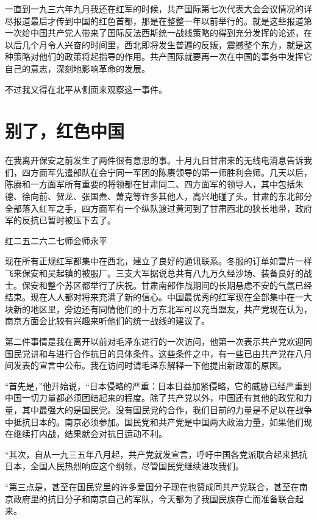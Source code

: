\documentclass[10pt]{book}
\begin{document}
一直到一九三六年九月我还在红军的时候，共产国际第七次代表大会会议情况的详尽报道最后才传到中国的红色首都，那是在整整一年以前举行的。就是这些报道第一次给中国共产党人带来了国际反法西斯统一战线策略的得到充分发挥的论述，在以后几个月令人兴奋的时间里，西北即将发生普遍的反叛，震撼整个东方，就是这种策略对他们的政策将起指导的作用。共产国际就要再一次在中国的事务中发挥它自己的意志，深刻地影响革命的发展。

不过我又得在北平从侧面来观察这一事件。

\section{别了，红色中国}

在我离开保安之前发生了两件很有意思的事。十月九日甘肃来的无线电消息告诉我们，四方面军先遣部队在会宁同一军团的陈赓领导的第一师胜利会师。几天以后，陈赓和一方面军所有重要的将领都在甘肃同二、四方面军的领导人，其中包括朱德、徐向前、贺龙、张国焘、萧克等许多其他人，高兴地碰了头。甘肃的东北部分全部落入红军之手，四方面军有一个纵队渡过黄河到了甘肃西北的狭长地带，政府军的反抗已暂时被压下去了。

红二五二六二七师会师永平

现在所有正规红军都集中在西北，建立了良好的通讯联系。冬服的订单如雪片一样飞来保安和吴起镇的被服厂。三支大军据说总共有八九万久经沙场、装备良好的战士。保安和整个苏区都举行了庆祝。甘肃南部作战期间的长期悬虑不安的气氛已经结束。现在人人都对将来充满了新的信心。中国最优秀的红军现在全部集中在一大块新的地区里，旁边还有同情他们的十万东北军可以充当盟友，共产党现在认为，南京方面会比较有兴趣来听他们的统一战线的建议了。

第二件事情是我在离开以前对毛泽东进行的一次访问，他第一次表示共产党欢迎同国民党讲和与进行合作抗日的具体条件。这些条件之中，有一些已由共产党在八月间发表的宣言中公布。我在访问时请毛泽东解释一下他提出新政策的原因。

“首先是，”他开始说，“日本侵略的严重：日本日益加紧侵略，它的威胁已经严重到中国一切力量都必须团结起来的程度。除了共产党以外，中国还有其他的政党和力量，其中最强大的是国民党。没有国民党的合作，我们目前的力量是不足以在战争中抵抗日本的。南京必须参加。国民党和共产党是中国两大政治力量，如果他们现在继续打内战，结果就会对抗日运动不利。

“其次，自从一九三五年八月起，共产党就发宣言，呼吁中国各党派联合起来抵抗日本，全国人民热烈响应这个纲领，尽管国民党继续进攻我们。

“第三点是，甚至在国民党里的许多爱国分子现在也赞成同共产党联合，甚至在南京政府里的抗日分子和南京自己的军队，今天都为了我国民族存亡而准备联合起来。
\end{document}
